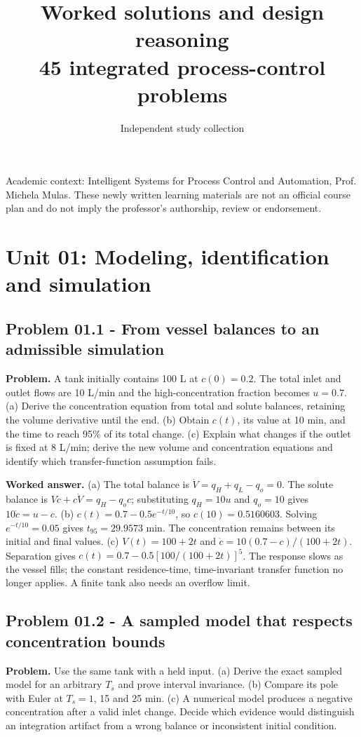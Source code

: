 \documentclass[11pt,a4paper]{article}
\title{Worked solutions and design reasoning\\[4pt]{\large 45 integrated process-control problems}}
\author{Independent study collection}
\date{}
\begin{document}
\maketitle
\noindent Academic context: Intelligent Systems for Process Control and Automation, Prof. Michela Mulas. These newly written learning materials are not an official course plan and do not imply the professor's authorship, review or endorsement.

\tableofcontents\newpage
\clearpage\section{Unit 01: Modeling, identification and simulation}
\subsection{Problem 01.1 - From vessel balances to an admissible simulation}
\textbf{Problem.} A tank initially contains 100 L at $c(0)=0.2$. The total inlet and outlet flows are 10 L/min and the high-concentration fraction becomes $u=0.7$. (a) Derive the concentration equation from total and solute balances, retaining the volume derivative until the end. (b) Obtain $c(t)$, its value at 10 min, and the time to reach 95\% of its total change. (c) Explain what changes if the outlet is fixed at 8 L/min; derive the new volume and concentration equations and identify which transfer-function assumption fails.


\textbf{Worked answer.} (a) The total balance is $\dot V=q_H+q_L-q_o=0$. The solute balance is $V\dot c+c\dot V=q_H-q_oc$; substituting $q_H=10u$ and $q_o=10$ gives $10\dot c=u-c$. (b) $c(t)=0.7-0.5e^{-t/10}$, so $c(10)=0.5160603$. Solving $e^{-t/10}=0.05$ gives $t_{95}=29.9573$ min. The concentration remains between its initial and final values. (c) $V(t)=100+2t$ and $\dot c=10(0.7-c)/(100+2t)$. Separation gives $c(t)=0.7-0.5[100/(100+2t)]^5$. The response slows as the vessel fills; the constant residence-time, time-invariant transfer function no longer applies. A finite tank also needs an overflow limit.

\subsection{Problem 01.2 - A sampled model that respects concentration bounds}
\textbf{Problem.} Use the same tank with a held input. (a) Derive the exact sampled model for an arbitrary $T_s$ and prove interval invariance. (b) Compare its pole with Euler at $T_s=1$, 15 and 25 min. (c) A numerical model produces a negative concentration after a valid inlet change. Decide which evidence would distinguish an integration artifact from a wrong balance or inconsistent initial condition.
\end{document}
